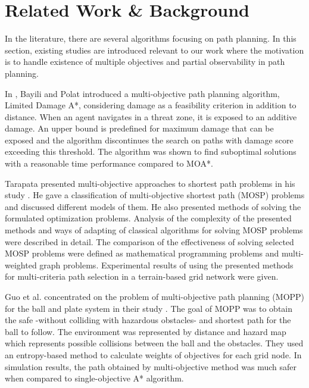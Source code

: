 \documentclass[10pt,journal]{IEEEtran}
\begin{document}
\section{Related Work \& Background}
\label{chapter:relatedwork}

In the literature, there are several algorithms focusing on path planning. In this section, existing studies are introduced relevant to our work where the motivation is to handle existence of multiple objectives and partial observability in path planning.

In  \cite{LDAStarBayili:2008}, Bayili and Polat introduced a multi-objective path planning algorithm, Limited Damage A*,  considering damage as a feasibility criterion in addition to distance. When an agent navigates in a threat zone, it is exposed to an additive damage. An upper bound is predefined for maximum damage that can be exposed and the algorithm discontinues the search on paths with damage score exceeding this threshold. The algorithm was shown to find suboptimal solutions with a reasonable time performance compared to MOA*.

Tarapata presented multi-objective approaches to shortest path problems in his study \cite{Tarapata:2007}. He gave a classification of multi-objective shortest path (MOSP) problems and discussed different models of them. He also presented methods of solving the formulated optimization problems. Analysis of the complexity of the presented methods and ways of adapting of classical algorithms for solving MOSP problems were described in detail. The comparison of the effectiveness of solving selected MOSP problems were defined as mathematical programming problems and multi-weighted graph problems. Experimental results of using the presented methods for multi-criteria path selection in a terrain-based grid network were given.

Guo et al. concentrated on the problem of multi-objective path planning (MOPP) for the ball and plate system in their study \cite{Guo:2009}. The goal of MOPP was to obtain the safe -without colliding with hazardous obstacles- and shortest path for the ball to follow. The environment was represented by distance and hazard map which represents possible collisions between the ball and the obstacles. They used an entropy-based method to calculate weights of objectives for each grid node. In simulation results, the path obtained by multi-objective method was much safer when compared to single-objective A* algorithm.
\end{document}
